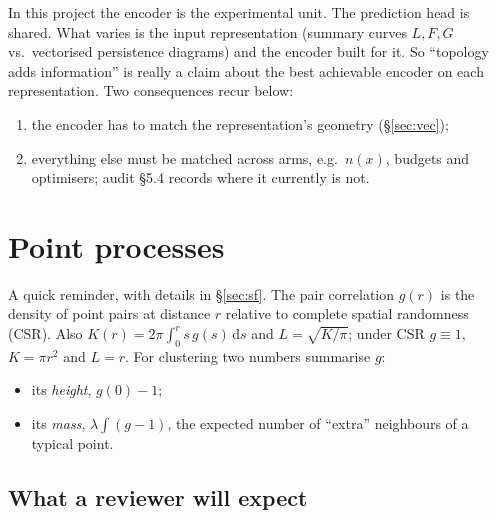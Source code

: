 \documentclass[10pt,a4paper]{article}
\newcommand{\dd}{\,\mathrm{d}}
\begin{document}
In this project the encoder is the experimental unit. The prediction head is shared. What varies is the input representation (summary curves $L,F,G$ vs.\ vectorised persistence diagrams) and the encoder built for it. So ``topology adds information'' is really a claim about the best achievable encoder on each representation. Two consequences recur below:
\begin{enumerate}
  \item the encoder has to match the representation's geometry (\S\ref{sec:vec});
  \item everything else must be matched across arms, e.g.\ $n(x)$, budgets and optimisers; audit \S5.4 records where it currently is not.
\end{enumerate}

\section{Point processes}\label{sec:pp}

A quick reminder, with details in \S\ref{sec:sf}. The pair correlation $g(r)$ is the density of point pairs at distance $r$ relative to complete spatial randomness (CSR). Also $K(r)=2\pi\int_0^r s\,g(s)\dd s$ and $L=\sqrt{K/\pi}$; under CSR $g\equiv1$, $K=\pi r^2$ and $L=r$. For clustering two numbers summarise $g$:
\begin{itemize}
  \item its \emph{height}, $g(0)-1$;
  \item its \emph{mass}, $\lambda\int(g-1)$, the expected number of ``extra'' neighbours of a typical point.
\end{itemize}

\subsection{What a reviewer will expect}\label{sec:rank}
\end{document}
